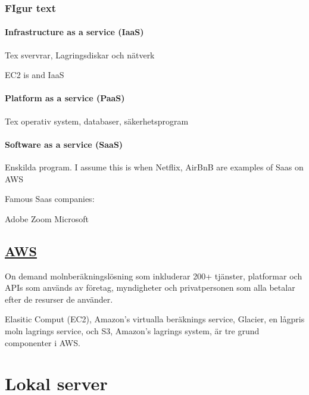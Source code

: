\documentclass[
  letterpaper,
  DIV=11,
  numbers=noendperiod]{scrreprt}
\let\oldparagraph\paragraph
\renewcommand{\paragraph}[1]{\oldparagraph{#1}\mbox{}}
\begin{document}
\subsubsection{FIgur text}\label{figur-text}

\paragraph{Infrastructure as a service
(IaaS)}\label{infrastructure-as-a-service-iaas}

Tex svervrar, Lagringsdiskar och nätverk

EC2 is and IaaS

\paragraph{Platform as a service
(PaaS)}\label{platform-as-a-service-paas}

Tex operativ system, databaser, säkerhetsprogram

\paragraph{Software as a service
(SaaS)}\label{software-as-a-service-saas}

Enskilda program. I assume this is when Netflix, AirBnB are examples of
Saas on AWS

Famous Saas companies:

Adobe Zoom Microsoft

\subsection{\texorpdfstring{\href{https://www.spiceworks.com/tech/cloud/articles/aws-basics/}{AWS}}{AWS}}\label{aws}

On demand molnberäkningslösning som inkluderar 200+ tjänster, platformar
och APIs som används av företag, myndigheter och privatpersonen som alla
betalar efter de resurser de använder.

Elasitic Comput (EC2), Amazon's virtualla beräknings service, Glacier,
en lågpris moln lagrings service, och S3, Amazon's lagrings system, är
tre grund componenter i AWS.

\section{Lokal server}\label{lokal-server-1}

\end{document}
